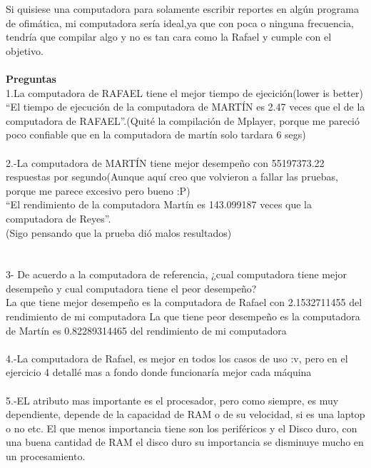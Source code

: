 \documentclass[12pt, letterpaper, twoside]{article}
\begin{document}
 Si quisiese una computadora para solamente escribir reportes en algún programa de ofimática, mi computadora sería ideal,ya que con poca o ninguna frecuencia, tendría que compilar algo y no es tan cara como la Rafael y cumple con el objetivo.\\\\
 
 \textbf{Preguntas}\\
 1.La computadora de RAFAEL tiene el mejor tiempo de ejecición(lower is better)
 \\
 “El tiempo de ejecución de la computadora de MARTÍN es 2.47 veces que el de la
computadora de RAFAEL”.(Quité la compilación de Mplayer, porque me pareció poco confiable que en la computadora de martín solo tardara 6 segs)
\\\\2.-La computadora de MARTÍN tiene mejor desempeño con 55197373.22 respuestas por segundo(Aunque aquí creo que volvieron a fallar las pruebas, porque me parece excesivo pero bueno :P)
\\ “El rendimiento de la computadora Martín es 143.099187 veces que la computadora de Reyes”.
\\(Sigo pensando que la prueba dió malos resultados)\\\\
\\3- De acuerdo a la computadora de referencia, ¿cual computadora tiene mejor desempeño y
cual computadora tiene el peor desempeño?\\
La que tiene mejor desempeño es la computadora de Rafael con 2.1532711455 del rendimiento de mi computadora
La que tiene peor desempeño es la computadora de Martín es 0.82289314465  del rendimiento de mi computadora\\\\
4.-La computadora de Rafael, es mejor en todos los casos de uso :v, pero en el ejercicio 4 detallé mas a fondo donde funcionaría mejor cada máquina 
\\\\
5.-EL atributo mas importante es el procesador, pero como siempre, es muy dependiente, depende de la capacidad de RAM o de su velocidad, si es una laptop o no etc. El que menos importancia tiene son los periféricos y el Disco duro, con una buena cantidad de RAM el disco duro su importancia se disminuye mucho en un procesamiento.
\end{document}

